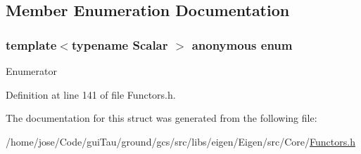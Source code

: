 \subsection{Member Enumeration Documentation}
\hypertarget{structei__functor__traits_3_01ei__scalar__quotient__op_3_01_scalar_01_4_01_4_a2c8bbbd943be1b8d9a2c9a4d5b50631b}{\subsubsection[{anonymous enum}]{\setlength{\rightskip}{0pt plus 5cm}template$<$typename Scalar $>$ anonymous enum}}\label{structei__functor__traits_3_01ei__scalar__quotient__op_3_01_scalar_01_4_01_4_a2c8bbbd943be1b8d9a2c9a4d5b50631b}
\begin{Desc}
\item[Enumerator]\par
\begin{description}
\item[{\em 
\hypertarget{structei__functor__traits_3_01ei__scalar__quotient__op_3_01_scalar_01_4_01_4_a2c8bbbd943be1b8d9a2c9a4d5b50631ba9befbd188bca42913a4cc6617e25857d}{Cost}\label{structei__functor__traits_3_01ei__scalar__quotient__op_3_01_scalar_01_4_01_4_a2c8bbbd943be1b8d9a2c9a4d5b50631ba9befbd188bca42913a4cc6617e25857d}
}]\end{description}
\end{Desc}


Definition at line 141 of file Functors.\-h.



The documentation for this struct was generated from the following file\-:\begin{DoxyCompactItemize}
\item 
/home/jose/\-Code/gui\-Tau/ground/gcs/src/libs/eigen/\-Eigen/src/\-Core/\hyperlink{_core_2_functors_8h}{Functors.\-h}\end{DoxyCompactItemize}
